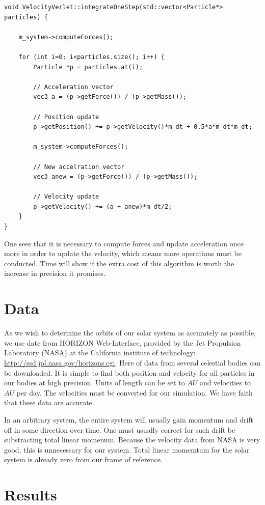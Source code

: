 \documentclass[10pt,a4paper]{amsart}
\begin{document}
\begin{lstlisting}
void VelocityVerlet::integrateOneStep(std::vector<Particle*> particles) {
    
	m_system->computeForces();
    
	for (int i=0; i<particles.size(); i++) {
		Particle *p = particles.at(i);

		// Acceleration vector
		vec3 a = (p->getForce()) / (p->getMass());

		// Position update
		p->getPosition() += p->getVelocity()*m_dt + 0.5*a*m_dt*m_dt;

		m_system->computeForces();

		// New accelration vector
		vec3 anew = (p->getForce()) / (p->getMass());

		// Velocity update
		p->getVelocity() += (a + anew)*m_dt/2;
	}
}
\end{lstlisting}
One sees that it is necessary to compute forces and update acceleration once more in order to update the velocity, which means more operations must be conducted. Time will show if the extra cost of this algorithm is worth the  increase in precision it promises.

\section{Data}
As we wish to determine the orbits of our solar system as accurately as possible, we use date from HORIZON Web-Interface, provided by the Jet Propulsion Laboratory (NASA) at the California institute of technology: \url{http://ssd.jpl.nasa.gov/horizons.cgi}. Here of data from several celestial bodies can be downloaded. It is simple to find both position and velocity for all particles in our bodies at high precision. Units of length can be set to $AU$ and velocities to $AU$ per day. The velocities must be converted for our simulation. We have faith that these data are accurate.

In an arbitrary system, the entire system will usually gain momentum and drift off in some direction over time. One must usually correct for such drift be substracting total linear momenum. Because the velocity data from NASA is very good, this is unnecessary for our system. Total linear momemtum for the solar system is already zero from our frame of reference.

\section{Results}
\end{document}

